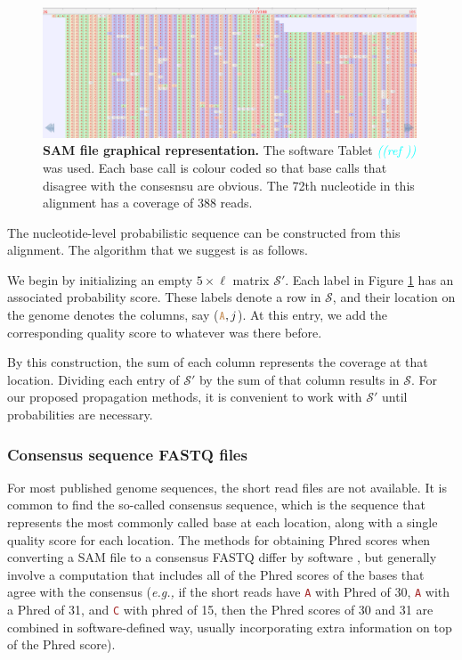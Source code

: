 \documentclass[
]{article}
\newcommand{\comment}[1]{\textsl{\textcolor{cyan}{((#1))}}}
\newcommand{\eg}{\textit{e.g.,}\xspace}
\newcommand{\sq}[1]{\texttt{\textcolor{brown}{#1}}}
\newcommand{\nps}{\mathcal{S}} %
\begin{document}
\begin{figure}[ht]
\centering
    \includegraphics[width=0.99\textwidth]{../ms/figs/sam-tablet.png}
\caption{\textbf{SAM file graphical representation.} The software Tablet \comment{ref } was used. Each base call is colour coded so that base calls that disagree with the consesnsu are obvious. The 72th nucleotide in this alignment has a coverage of 388 reads.}
\label{fig:sam}
\end{figure}

The nucleotide-level probabilistic sequence can be constructed from this
alignment. The algorithm that we suggest is as follows.

We begin by initializing an empty \(5\times\ell\) matrix \(\nps'\). Each
label in Figure \ref{fig:sam} has an associated probability score. These
labels denote a row in \(\nps\), and their location on the genome
denotes the columns, say (\(\sq{A}, j\)). At this entry, we add the
corresponding quality score to whatever was there before.

By this construction, the sum of each column represents the coverage at
that location. Dividing each entry of \(\nps'\) by the sum of that
column results in \(\nps\). For our proposed propagation methods, it is
convenient to work with \(\nps'\) until probabilities are necessary.

\hypertarget{consensus-sequence-fastq-files}{%
\subsubsection{Consensus sequence FASTQ
files}\label{consensus-sequence-fastq-files}}

For most published genome sequences, the short read files are not
available. It is common to find the so-called consensus sequence, which
is the sequence that represents the most commonly called base at each
location, along with a single quality score for each location. The
methods for obtaining Phred scores when converting a SAM file to a
consensus FASTQ differ by software
\citep[\citet{keithSimulatedAnnealingAlgorithm2002},
\citet{liMappingShortDNA2008}]{liAdjustQualityScores2004}, but generally
involve a computation that includes all of the Phred scores of the bases
that agree with the consensus (\eg if the short reads have \sq{A} with
Phred of 30, \sq{A} with a Phred of 31, and \sq{C} with phred of 15,
then the Phred scores of 30 and 31 are combined in software-defined way,
usually incorporating extra information on top of the Phred score).
\end{document}

